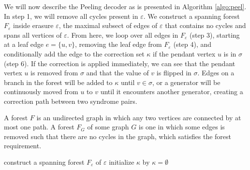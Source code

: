 



We will now describe the Peeling decoder as is presented in Algorithm \ref{algo:peel}. In step 1, we will remove all cycles present in $\varepsilon$. We construct a spanning forest $F_\varepsilon$ inside erasure $\varepsilon$, the maximal subsect of edges of $\varepsilon$ that contains no cycles and spans all vertices of $\varepsilon$. From here, we loop over all edges in $F_\varepsilon$ (step 3), starting at a leaf edge $e = \{u,v\}$, removing the leaf edge from $F_\varepsilon$ (step 4), and conditionally add the edge to the correction set $\kappa$ if the pendant vertex $u$ is in $\sigma$ (step 6). If the correction is applied immediately, we can see that the pendant vertex $u$ is removed from $\sigma$ and that the value of $v$ is flipped in $\sigma$. Edges on a branch in the forest will be added to $\kappa$ until $v \in \sigma$, or a generator will be continuously moved from $u$ to $v$ until it encounters another generator, creating a correction path between two syndrome pairs.

\begin{lemma}\label{lem:forestofgraph}
  A forest $F$ is an undirected graph in which any two vertices are connected by at most one path. A forest $F_G$ of some graph $G$ is one in which some edges is removed such that there are no cycles in the graph, which satisfies the forest requirement.
\end{lemma}

\begin{algo}[algotitle=Peeling decoder \cite{delfosse2017linear}, label=algo:peel]
  \begin{algorithm}[H]
    \BlankLine
    construct a spanning forest $F_\varepsilon$ of $\varepsilon$\;
    initialize $\kappa$ by $\kappa = {\emptyset}$\;
    \KwRet{$\kappa$}
  \end{algorithm}
\end{algo}

